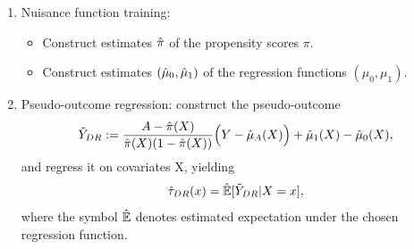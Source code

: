 \documentclass[../thesis.tex]{subfiles}
\begin{document}
\begin{enumerate}
    \item Nuisance function training:
    \begin{itemize}
        \item Construct estimates $\hat{\pi}$ of the propensity scores $\pi$.
        \item Construct estimates $(\hat{\mu}_0, \hat{\mu}_1)$ of the regression functions $(\mu_0, \mu_1)$.
    \end{itemize}
    \item Pseudo-outcome regression: construct the pseudo-outcome
    \[\Tilde{Y}_{DR} := \frac{A - \hat{\pi}(X)}{\hat{\pi}(X)(1-\hat{\pi}(X))}\Big( Y - \hat{\mu}_A(X)\Big) + \hat{\mu}_1(X) - \hat{\mu}_0(X),\]
    and regress it on covariates X, yielding
    \[\hat{\tau}_{DR}(x) = \hat{\mathbb{E}}[\Tilde{Y}_{DR} | X = x],\]
    where the symbol $\hat{\mathbb{E}}$ denotes estimated expectation under the chosen regression function.
\end{enumerate}
\end{document}
